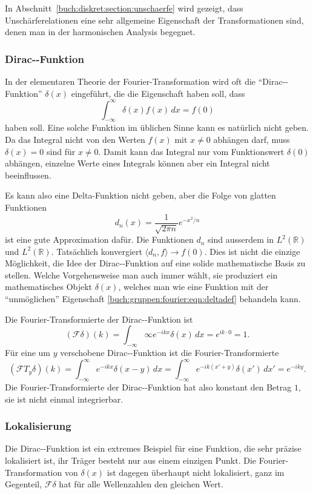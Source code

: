 In Abschnitt~\ref{buch:diskret:section:unschaerfe} wird gezeigt, dass
Unschärferelationen eine sehr allgemeine Eigenschaft der Transformationen
sind, denen man in der harmonischen Analysis begegnet.

%
%
\subsubsection{Dirac-\textdelta-Funktion}
In der elementaren Theorie der Fourier-Transformation wird oft 
die ``Dirac-\textdelta-Funktion'' $\delta(x)$ eingeführt, die die
Eigenschaft haben soll, dass
\begin{equation}
\int_{-\infty}^\infty \delta(x) f(x)\,dx = f(0)
\label{buch:gruppen:fourier:eqn:deltadef}
\end{equation}
haben soll.
Eine solche Funktion im üblichen Sinne kann es natürlich nicht geben.
Da das Integral nicht von den Werten $f(x)$ mit $x\ne 0$ abhängen darf,
muss $\delta(x)=0$ sind für $x\ne 0$.
Damit kann das Integral nur vom Funktionswert $\delta(0)$ abhängen,
einzelne Werte eines Integrals können aber ein Integral nicht beeinflussen.

Es kann also eine Delta-Funktion nicht geben, aber die Folge von
glatten Funktionen
\[
d_n(x) = \frac{1}{\sqrt{2\pi n}} e^{-x^2/n}
\]
ist eine gute Approximation dafür.
Die Funktionen $d_n$ sind ausserdem in $L^2(\mathbb{R})$ und
$L^2(\mathbb{R})$.
Tatsächlich konvergiert $\langle d_n,f\rangle \to f(0)$.
Dies ist nicht die einzige Möglichkeit, die Idee der 
Dirac-\textdelta-Funktion auf eine solide mathematische Basis zu
stellen.
Welche Vorgehensweise man auch immer wählt, sie produziert ein
mathematisches Objekt $\delta(x)$, welches man wie eine Funktion
mit der ``unmöglichen'' Eigenschaft
\eqref{buch:gruppen:fourier:eqn:deltadef}
behandeln kann.

Die Fourier-Transformierte der Dirac-\textdelta-Funktion ist
\[
(\mathscr{F}\delta)(k)
=
\int_{-\infty}\infty e^{-ikx}\delta(x)\,dx
=
e^{ik\cdot 0}
=
1.
\]
Für eine um $y$ verschobene Dirac-\textdelta-Funktion ist die
Fourier-Transformierte
\[
(\mathscr{F}T_y\delta)(k)
=
\int_{-\infty}^\infty e^{-ikx}\delta(x-y)\,dx
=
\int_{-\infty}^\infty e^{-ik(x'+y)}\delta(x')\,dx'
=
e^{-iky}.
\]
Die Fourier-Transformierte der Dirac-\textdelta-Funktion hat also 
konstant den Betrag $1$, sie ist nicht einmal integrierbar.

%
%
\subsubsection{Lokalisierung}
Die Dirac-\textdelta-Funktion ist ein extremes Beispiel für eine
Funktion, die sehr präzise lokalisiert ist, ihr Träger besteht nur
aus einem einzigen Punkt.
Die Fourier-Transformation von $\delta(x)$ ist dagegen überhaupt
nicht lokalisiert, ganz im Gegenteil, $\mathscr{F}\delta$ hat für alle
Wellenzahlen den gleichen Wert.

